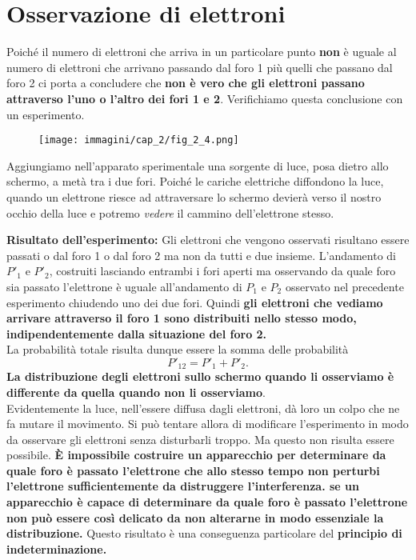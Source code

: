 \section*{Osservazione di elettroni}
Poiché il numero di elettroni che arriva in un particolare punto \textbf{non} è uguale al numero di elettroni che arrivano passando dal foro 1 più quelli che passano dal foro 2 ci porta a concludere che \textbf{non è vero che gli elettroni passano attraverso l'uno o l'altro dei fori 1 e 2}. Verifichiamo questa conclusione con un esperimento.\\
\begin{figure}[!htbp]
\begin{center}
\texttt{[image: immagini/cap\_2/fig\_2\_4.png]}
\end{center}
\end{figure}

Aggiungiamo nell'apparato sperimentale una sorgente di luce, posa dietro allo schermo, a metà tra i due fori. Poiché le cariche elettriche diffondono la luce, quando un elettrone riesce ad attraversare lo schermo devierà verso il nostro occhio della luce e potremo \textit{vedere} il cammino dell'elettrone stesso.

\textbf{Risultato dell'esperimento:} Gli elettroni che vengono osservati risultano essere passati o dal foro 1 o dal foro 2 ma non da tutti e due insieme. L'andamento di $P'_1$ e $P'_2$, costruiti lasciando entrambi i fori aperti ma osservando da quale foro sia passato l'elettrone è uguale all'andamento di $P_1$ e $P_2$ osservato nel precedente esperimento chiudendo uno dei due fori. Quindi \textbf{gli elettroni che vediamo arrivare attraverso il foro 1 sono distribuiti nello stesso modo, indipendentemente dalla situazione del foro 2.}\\
La probabilità totale risulta dunque essere la somma delle probabilità
\begin{equation}
P'_{12}= P'_1 + P'_2.
\end{equation}
\textbf{La distribuzione degli elettroni sullo schermo quando li osserviamo è differente da quella quando non li osserviamo}.\\
Evidentemente la luce, nell'essere diffusa dagli elettroni, dà loro un colpo che ne fa mutare il movimento. Si può tentare allora di modificare l'esperimento in modo da osservare gli elettroni senza disturbarli troppo. Ma questo non risulta essere possibile. \textbf{È impossibile costruire un apparecchio per determinare da quale foro è passato l'elettrone che allo stesso tempo non perturbi l'elettrone sufficientemente da distruggere l'interferenza. se un apparecchio è capace di determinare da quale foro è passato l'elettrone  non può essere così delicato da non alterarne in modo essenziale la distribuzione.} Questo risultato è una conseguenza particolare del \textbf{principio di indeterminazione.}
